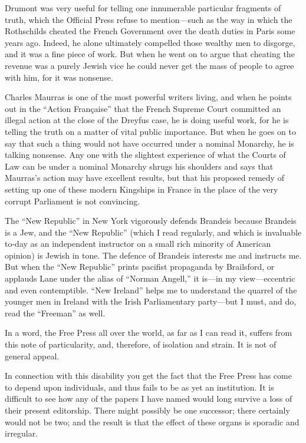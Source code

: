 \documentclass{book}
\begin{document}
Drumont was very useful for telling one innumerable particular fragments of truth, which the Official Press refuse to mention—such as the way in which the Rothschilds cheated the French Government over the death duties in Paris some years ago. Indeed, he alone ultimately compelled those wealthy men to disgorge, and it was a fine piece of work. But when he went on to argue that cheating the revenue was a purely Jewish vice he could never get the mass of people to agree with him, for it was nonsense.

Charles Maurras is one of the most powerful writers living, and when he points out in the “Action Française” that the French Supreme Court committed an illegal action at the close of the Dreyfus case, he is doing useful work, for he is telling the truth on a matter of vital public importance. But when he goes on to say that such a thing would not have occurred under a nominal Monarchy, he is talking nonsense. Any one with the slightest experience of what the Courts of Law can be under a nominal Monarchy shrugs his shoulders and says that Maurras’s action may have excellent results, but that his proposed remedy of setting up one of these modern Kingships in France in the place of the very corrupt Parliament is not convincing.

The “New Republic” in New York vigorously defends Brandeis because Brandeis is a Jew, and the “New Republic” (which I read regularly, and which is invaluable to-day as an independent instructor on a small rich minority of American opinion) is Jewish in tone. The defence of Brandeis interests me and instructs me. But when the “New Republic” prints pacifist propaganda by Brailsford, or applauds Lane under the alias of “Norman Angell,” it is—in my view—eccentric and even contemptible. “New Ireland” helps me to understand the quarrel of the younger men in Ireland with the Irish Parliamentary party—but I must, and do, read the “Freeman” as well.

In a word, the Free Press all over the world, as far as I can read it, suffers from this note of particularity, and, therefore, of isolation and strain. It is not of general appeal.

In connection with this disability you get the fact that the Free Press has come to depend upon individuals, and thus fails to be as yet an institution. It is difficult to see how any of the papers I have named would long survive a loss of their present editorship. There might possibly be one successor; there certainly would not be two; and the result is that the effect of these organs is sporadic and irregular.
\end{document}

